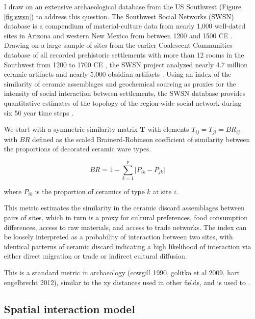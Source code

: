 \documentclass[fleqn,10pt]{wlscirep}
\begin{document}
I draw on an extensive archaeological database from the US Southwest (Figure \ref{fig:swsn}) to address this question. The Southwest Social Networks (SWSN) database is a compendium of material-culture data from nearly 1,000 well-dated sites in Arizona and western New Mexico from between 1200 and 1500 CE \cite{Mills2012,Mills2013a,Peeples2013,Borck2015,Hill2015,Mills2015a}. Drawing on a large sample of sites from the earlier Coalescent Communities database of all recorded prehistoric settlements with more than 12 rooms in the Southwest from 1200 to 1700 CE \cite{Hill2004}, the SWSN project analyzed nearly 4.7 million ceramic artifacts and nearly 5,000 obsidian artifacts \cite{Mills2015a}. Using an index of the similarity of ceramic assemblages and geochemical sourcing as proxies for the intensity of social interaction between settlements, the SWSN database provides quantitative estimates of the topology of the region-wide social network during six 50 year time steps \cite{Mills2013a}.


We start with a symmetric similarity matrix $\mathbf{T}$ with elements $T_{ij} = T_{ji} = BR_{ij}$ with $BR$ defined as the scaled Brainerd-Robinson coefficient of similarity between the proportions of decorated ceramic ware types.

$$BR = 1 - \sum_{k=1}^{p} \lvert P_{ik} - P_{jk} \rvert$$

where $P_{ik}$ is the proportion of ceramics of type $k$ at site $i$.

This metric estimates the similarity in the ceramic discard assemblages between pairs of sites, which in turn is a proxy for cultural preferences, food consumption differences, access to raw materials, and access to trade networks. The index can be loosely interpreted as a probability of interaction between two sites, with identical patterns of ceramic discard indicating a high likelihood of interaction via either direct migration or trade or indirect cultural diffusion.

This is a standard metric in archaeology (cowgill 1990, golitko et al 2009, hart engelbrecht 2012), similar to the xy distances used in other fields, and is used to .




\subsection*{Spatial interaction model}
\end{document}
